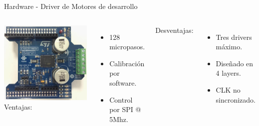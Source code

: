 \documentclass[aspectratio= 43]{beamer}
\begin{document}
\begin{frame}{Hardware - Driver de Motores de desarrollo}
   \begin{columns}
      \includegraphics[width=\textwidth, left]{./Figures/xnucleo.jpg}
      Ventajas:
      \begin{itemize}
         \item{128 micropasos.}
         \item{Calibración por software.}
         \item{Control por SPI @ 5Mhz.}
      \end{itemize}
      Desventajas:
      \begin{itemize}
         \item{Tres drivers máximo.}
         \item{Diseñado en 4 layers.}
         \item{CLK no sincronizado.}
      \end{itemize}
   \end{columns}
\end{frame}
\end{document}
